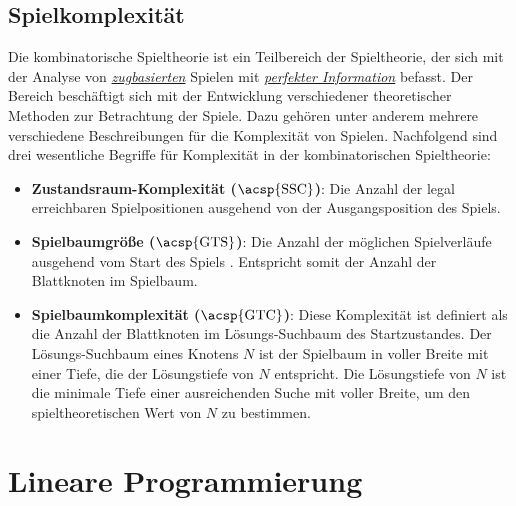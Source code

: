 \subsection{Spielkomplexität}

Die kombinatorische Spieltheorie ist ein Teilbereich der Spieltheorie, der sich mit der Analyse von \hyperref[text:game-theory-sequenziell]{\emph{zugbasierten}} Spielen mit \hyperref[text:game-theory-perfekte-information]{\emph{perfekter Information}} befasst. Der Bereich beschäftigt sich mit der Entwicklung verschiedener theoretischer Methoden zur Betrachtung der Spiele. Dazu gehören unter anderem mehrere verschiedene Beschreibungen für die Komplexität von Spielen. Nachfolgend sind drei wesentliche Begriffe für Komplexität in der kombinatorischen Spieltheorie:

\pagebreak

\begin{itemize}
    \item \textbf{Zustandsraum-Komplexität ($\text{\acsp{SSC}}$)}: Die Anzahl der legal erreichbaren Spielpositionen ausgehend von der Ausgangsposition des Spiels. \cite[S. 106]{2007.SolvingGames}
    \item \vspace*{-0.2cm} \textbf{Spielbaumgröße ($\text{\acsp{GTS}}$)}: Die Anzahl der möglichen Spielverläufe ausgehend vom Start des Spiels \cite[S. 1]{2019.GameTreeComplexityEstimation}. Entspricht somit der Anzahl der Blattknoten im Spielbaum.
    \item \vspace*{-0.2cm} \textbf{Spielbaumkomplexität ($\text{\acsp{GTC}}$)}: Diese Komplexität ist definiert als die Anzahl der Blattknoten im Lösungs-Suchbaum des Startzustandes. Der Lösungs-Suchbaum eines Knotens $N$ ist der Spielbaum in voller Breite mit einer Tiefe, die der Lösungstiefe von $N$ entspricht. Die Lösungstiefe von $N$ ist die minimale Tiefe einer ausreichenden Suche mit voller Breite, um den spieltheoretischen Wert von $N$ zu bestimmen. \cite[S. 299]{2002.GamesSolved}
\end{itemize}

\vspace*{-0.2cm}
\vspace*{-0.15cm}

\section{Lineare Programmierung}
\label{chapter:lineare-programmierung}

